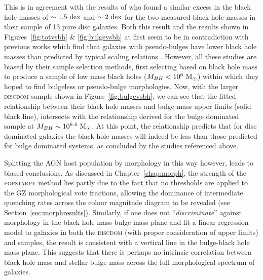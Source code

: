 {This is in agreement with the results of \citet{Simmons13} who found a similar excess in the black hole masses of $\sim 1.5~\rm{dex}$ and $\sim 2~\rm{dex}$ for the two measured black hole masses in their sample of 13 pure disc galaxies. Both this result and the results shown in Figures~\ref{fig:totvsbh} \& \ref{fig:bulgevsbh} at first seem to be in contradiction with previous works which find that galaxies with pseudo-bulges have lower black hole masses than predicted by typical scaling relations \citep[see work by][]{greene08, hu09, jiang11a, mathur12, ho14}. However, all these studies are biased by their sample selection methods, first selecting based on black hole mass to produce a sample of low mass black holes ($M_{BH} < 10^6 ~\rm{M}_{\odot}$) within which they hoped to find bulgeless or pseudo-bulge morphologies. Now, with the larger \textsc{discdom} sample shown in Figure~\ref{fig:bulgevsbh}, we can see that the fitted relationship between their black hole masses and bulge mass upper limits (solid black line), intersects with the relationship derived for the bulge dominated \citet{haringrix04} sample at $M_{BH} \sim 10^{6.4} ~\rm{M}_{\odot}$. At this point, the relationship predicts that for disc dominated galaxies the black hole masses will indeed be less than those predicted for bulge dominated systems, as concluded by the studies referenced above. 

Splitting the AGN host population by morphology in this way however, leads to biased conclusions. As discussed in Chapter~\ref{chap:morph}, the strength of the \textsc{popstarpy} method lies partly due to the fact that no thresholds are applied to the GZ morphological vote fractions, allowing the dominance of intermediate quenching rates across the colour magnitude diagram to be revealed (see Section~\ref{sec:morphresults}). Similarly, if one does not ``\emph{discriminate}'' against morphology in the black hole mass-bulge mass plane and fit a linear regression model to galaxies in both the \textsc{discdom} (with proper consideration of upper limits) and \citet{haringrix04} samples, the result is consistent with a vertical line in the bulge-black hole mass plane. This suggests that there is perhaps no intrinsic correlation between black hole mass and stellar bulge mass across the full morphological spectrum of galaxies. 

}
